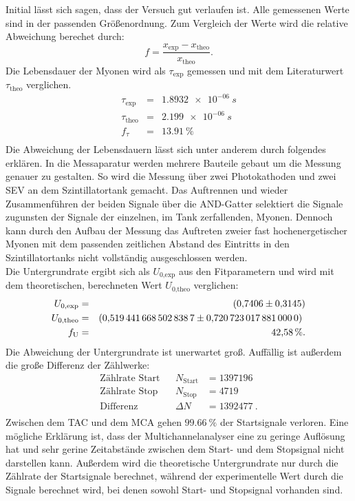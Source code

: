 Initial lässt sich sagen, dass der Versuch gut verlaufen ist.
Alle gemessenen Werte sind in der passenden Größenordnung.
Zum Vergleich der Werte wird die relative Abweichung berechet durch:
\begin{equation*}
  f=\frac{x_{\text{exp}}-x_{\text{theo}}}{x_{\text{theo}}}.
\end{equation*}
Die Lebensdauer der Myonen wird als $\tau_{\text{exp}}$ gemessen und mit dem Literaturwert $\tau_{\text{theo}}$ \cite{Demtröder} verglichen.
\begin{align*}
  \tau_{\text{exp}}   &=&   \SI{1.8932e-06}{s}  \\
  \tau_{\text{theo}}  &=&   \SI{2.199e-06}{s}   \\
  f_{\tau}            &=&   \SI{13.91}{\%}      \\
\end{align*}
Die Abweichung der Lebensdauern lässt sich unter anderem durch folgendes erklären.
In die Messaparatur werden mehrere Bauteile gebaut um die Messung genauer zu gestalten.
So wird die Messung über zwei Photokathoden und zwei SEV an dem Szintillatortank gemacht.
Das Auftrennen und wieder Zusammenführen der beiden Signale über die AND-Gatter selektiert die Signale zugunsten der Signale der einzelnen, im Tank zerfallenden, Myonen.
Dennoch kann durch den Aufbau der Messung das Auftreten zweier fast hochenergetischer Myonen mit dem passenden zeitlichen Abstand des Eintritts in den Szintillatortanks nicht vollständig ausgeschlossen werden.\\
Die Untergrundrate ergibt sich als $U_{\text{0,exp}}$ aus den Fitparametern und wird mit dem theoretischen, berechneten Wert $U_{\text{0,theo}}$ verglichen:
\begin{align*}
  U_{\text{0,exp}}    &=&  \SI{0.7406 \pm 0.3145}{} \\
  U_{\text{0,theo}}   &=&  \SI{0.5194416685028387 \pm 0.720723017881}{}   \\
  f_{\text{U}}        &=&  \SI{42.58}{\%}. \\
\end{align*}
Die Abweichung der Untergrundrate ist unerwartet groß.
Auffällig ist außerdem die große Differenz der Zählwerke:
\begin{align*}
  \text{Zählrate Start}    && N_{\text{Start}}  &=\SI{1397196}{} \\
  \text{Zählrate Stop}     && N_{\text{Stop}}   &=\SI{4719}{} \\
  \text{Differenz}         && \Delta N          &=\SI{1392477}{}.\\
\end{align*}
Zwischen dem TAC und dem MCA gehen $\SI{99.66}{\%}$ der Startsignale verloren.
Eine mögliche Erklärung ist, dass der Multichannelanalyser eine zu geringe Auflösung hat und sehr gerine Zeitabstände zwischen dem Start- und dem Stopsignal nicht darstellen kann.
Außerdem wird die theoretische Untergrundrate nur durch die Zählrate der Startsignale berechnet, während der experimentelle Wert durch die Signale berechnet wird, bei denen sowohl Start- und Stopsignal vorhanden sind.
